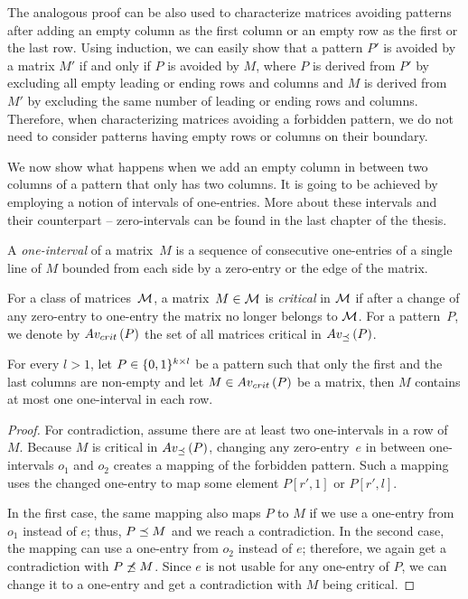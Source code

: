 The analogous proof can be also used to characterize matrices avoiding patterns after adding an empty column as the first column or an empty row as the first or the last row. Using induction, we can easily show that a pattern $P'$ is avoided by a matrix $M'$ if and only if $P$ is avoided by $M$, where $P$ is derived from $P'$ by excluding all empty leading or ending rows and columns and $M$ is derived from $M'$ by excluding the same number of leading or ending rows and columns. Therefore, when characterizing matrices avoiding a forbidden pattern, we do not need to consider patterns having empty rows or columns on their boundary.

We now show what happens when we add an empty column in between two columns of a pattern that only has two columns. It is going to be achieved by employing a notion of intervals of one-entries. More about these intervals and their counterpart -- zero-intervals can be found in the last chapter of the thesis.

\begin{defn}
A \emph{one-interval} of a matrix~$M$ is a sequence of consecutive one-entries of a single line of $M$ bounded from each side by a zero-entry or the edge of the matrix.
\end{defn}

\begin{defn}
For a class of matrices~$\mathcal{M}$, a matrix~$M\in\mathcal{M}$ is \emph{critical} in $\mathcal{M}$ if after a change of any zero-entry to one-entry the matrix no longer belongs to $\mathcal{M}$. For a pattern~$P$, we denote by $Av_{crit}\left(P\right)$ the set of all matrices critical in $Av_{\preceq}\left(P\right)$. 
\end{defn}

\begin{lemma}
\label{lemma:twocols}
For every $l>1$, let $P\in\{0,1\}^{k\times l}$ be a pattern such that only the first and the last columns are non-empty and let $M\in Av_{crit}\left(P\right)$ be a matrix, then $M$ contains at most one one-interval in each row.
\end{lemma}
\begin{proof}
For contradiction, assume there are at least two one-intervals in a row of $M$. Because $M$ is critical in $Av_{\preceq}\left(P\right)$, changing any zero-entry~$e$ in between one-intervals $o_1$ and $o_2$ creates a mapping of the forbidden pattern. Such a mapping uses the changed one-entry to map some element $P[r',1]$ or $P[r',l]$.

In the first case, the same mapping also maps $P$ to $M$ if we use a one-entry from $o_1$ instead of $e$; thus, $P\preceq M$ and we reach a contradiction. In the second case, the mapping can use a one-entry from $o_2$ instead of $e$; therefore, we again get a contradiction with $P\not\preceq M$. Since $e$ is not usable for any one-entry of $P$, we can change it to a one-entry and get a contradiction with $M$ being critical.
\end{proof}

